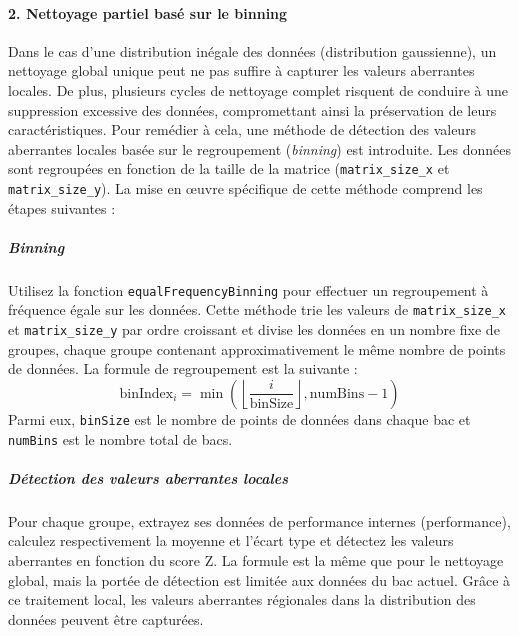 \documentclass{rapportECL2024}
\begin{document}
\paragraph{2. Nettoyage partiel basé sur le binning} 
Dans le cas d'une distribution inégale des données (distribution gaussienne), un nettoyage global unique peut ne pas suffire à capturer les valeurs aberrantes locales. De plus, plusieurs cycles de nettoyage complet risquent de conduire à une suppression excessive des données, compromettant ainsi la préservation de leurs caractéristiques. Pour remédier à cela, une méthode de détection des valeurs aberrantes locales basée sur le regroupement (\textit{binning}) est introduite. Les données sont regroupées en fonction de la taille de la matrice (\texttt{matrix\_size\_x} et \texttt{matrix\_size\_y}). La mise en œuvre spécifique de cette méthode comprend les étapes suivantes :
\subparagraph{Binning}
Utilisez la fonction \texttt{equalFrequencyBinning} pour effectuer un regroupement à fréquence égale sur les données. Cette méthode trie les valeurs de \texttt{matrix\_size\_x} et \texttt{matrix\_size\_y} par ordre croissant et divise les données en un nombre fixe de groupes, chaque groupe contenant approximativement le même nombre de points de données. La formule de regroupement est la suivante :
\[
\text{binIndex}_i = \min\left(\left\lfloor \frac{i}{\text{binSize}} \right\rfloor, \text{numBins} - 1\right)
\]
Parmi eux, \texttt{binSize} est le nombre de points de données dans chaque bac et \texttt{numBins} est le nombre total de bacs.
\subparagraph{Détection des valeurs aberrantes locales}
Pour chaque groupe, extrayez ses données de performance internes (performance), calculez respectivement la moyenne et l'écart type et détectez les valeurs aberrantes en fonction du score Z. La formule est la même que pour le nettoyage global, mais la portée de détection est limitée aux données du bac actuel. Grâce à ce traitement local, les valeurs aberrantes régionales dans la distribution des données peuvent être capturées.
\end{document}
